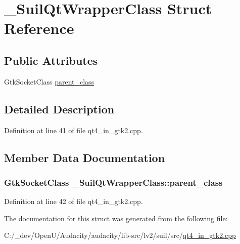 \hypertarget{struct___suil_qt_wrapper_class}{}\section{\+\_\+\+Suil\+Qt\+Wrapper\+Class Struct Reference}
\label{struct___suil_qt_wrapper_class}
\subsection*{Public Attributes}
\begin{DoxyCompactItemize}
\item 
Gtk\+Socket\+Class \hyperlink{struct___suil_qt_wrapper_class_ac5c1a0f6fc064e1d3115dfc7a74ae599}{parent\+\_\+class}
\end{DoxyCompactItemize}


\subsection{Detailed Description}


Definition at line 41 of file qt4\+\_\+in\+\_\+gtk2.\+cpp.



\subsection{Member Data Documentation}
\subsubsection[{\texorpdfstring{parent\+\_\+class}{parent_class}}]{\setlength{\rightskip}{0pt plus 5cm}Gtk\+Socket\+Class \+\_\+\+Suil\+Qt\+Wrapper\+Class\+::parent\+\_\+class}\hypertarget{struct___suil_qt_wrapper_class_ac5c1a0f6fc064e1d3115dfc7a74ae599}{}\label{struct___suil_qt_wrapper_class_ac5c1a0f6fc064e1d3115dfc7a74ae599}


Definition at line 42 of file qt4\+\_\+in\+\_\+gtk2.\+cpp.



The documentation for this struct was generated from the following file\+:\begin{DoxyCompactItemize}
\item 
C\+:/\+\_\+dev/\+Open\+U/\+Audacity/audacity/lib-\/src/lv2/suil/src/\hyperlink{qt4__in__gtk2_8cpp}{qt4\+\_\+in\+\_\+gtk2.\+cpp}\end{DoxyCompactItemize}
